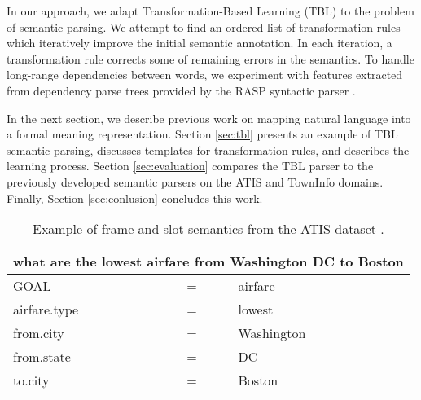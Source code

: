 \documentclass{article}
\begin{document}

In our approach, we adapt Transformation-Based Learning (TBL) \cite{brill95} to the problem of semantic parsing. We attempt to find an ordered list of transformation rules which iteratively improve the initial semantic annotation. 
In each iteration, a transformation rule corrects some of remaining errors in the semantics.
To handle long-range dependencies between words, we experiment with features extracted from dependency parse trees provided by the RASP syntactic parser \cite{rasp06}.


In the next section, we describe previous work on mapping natural language into a formal meaning representation. Section \ref{sec:tbl} presents an example of TBL semantic parsing, discusses templates for transformation rules, and describes the learning process. Section \ref{sec:evaluation} compares the TBL parser to the previously developed semantic parsers on the ATIS \cite{atis94} and TownInfo \cite{mairesse09} domains. Finally, Section \ref{sec:conlusion} concludes this work.

\begin{table}
\begin{center}
\begin{tabular}{lll} 
  \multicolumn{3}{l}{what are the lowest airfare from Washington DC to Boston} \\
  \hline
  GOAL          & = & airfare \\
  airfare.type  & = & lowest \\
  from.city     & = & Washington \\
  from.state    & = & DC \\
  to.city       & = & Boston \\
\end{tabular} 
\end{center}
\vspace{-0.5cm}
\caption{Example of frame and slot semantics from the ATIS dataset \cite{atis94}.}
\label{tbl:sem:example}
\end{table}
\end{document}
